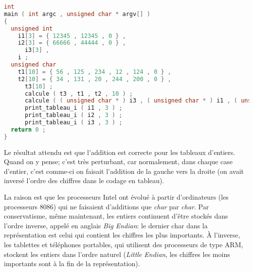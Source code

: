 \begin{solution}
\begin{lstlisting}[language=C]
int
main ( int argc , unsigned char * argv[] )
{
  unsigned int
    i1[3] = { 12345 , 12345 , 0 } ,
    i2[3] = { 66666 , 44444 , 0 } ,
      i3[3] ,
	i ;
  unsigned char
    t1[10] = { 56 , 125 , 234 , 12 , 124 , 0 } ,
    t2[10] = { 34 , 131 , 20 , 244 , 200 , 0 } ,
      t3[10] ;
      calcule ( t3 , t1 , t2 , 10 ) ;
      calcule ( ( unsigned char * ) i3 , ( unsigned char * ) i1 , ( unsigned char * ) i2 , 3 * sizeof ( int ) ) ;
      print_tableau_i ( i1 , 3 ) ;
      print_tableau_i ( i2 , 3 ) ;
      print_tableau_i ( i3 , 3 ) ;
  return 0 ;
}    
  \end{lstlisting}
  Le résultat attendu est que l'addition est correcte pour les
  tableaux d'entiers. Quand on y pense; c'est très perturbant, car
  normalement, dans chaque case d'entier, c'est comme-ci on faisait
  l'addition de la gauche vers la droite (on avait inversé l'ordre des
  chiffres dans le codage en tableau).

  La raison est que les processeurs Intel ont évolué à partir
  d'ordinateurs (les processeurs 8086) qui ne faisaient d'additions
  que \emph{char} par \emph{char}. Par conservatisme, même maintenant,
  les entiers continuent d'être stockés dans l'ordre inverse, appelé
  en anglais \emph{Big Endian}: le dernier char dans la représentation
  est celui qui contient les chiffres les plus importants. À
  l'inverse, les tablettes et téléphones portables, qui utilisent des
  processeurs de type ARM, stockent les entiers dans l'ordre naturel
  (\emph{Little Endian}, les chiffres les moins importants sont à la
  fin de la représentation). 
\end{solution}








